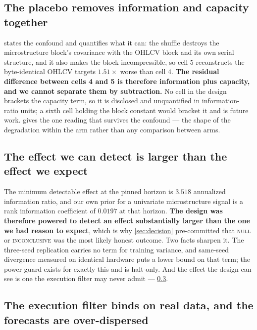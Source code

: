 \subsection{The placebo removes information and capacity together}
\label{sec:lim-placebo}

 states the confound and quantifies what it can: the shuffle destroys the
microstructure block's covariance with the OHLCV block and its own serial structure, and it also makes the
block incompressible, so cell 5 reconstructs the byte-identical OHLCV targets $1.51\times$ worse
than cell 4. \textbf{The residual difference between cells 4 and 5 is therefore information plus
capacity, and we cannot separate them by subtraction.} No cell in the design brackets the capacity
term, so it is disclosed and unquantified in information-ratio units; a sixth cell holding the
block constant would bracket it and is future work.  gives the one reading
that survives the confound --- the shape of the degradation within the arm rather than any
comparison between arms.

\subsection{The effect we can detect is larger than the effect we expect}
\label{sec:lim-power}

The minimum detectable effect at the pinned horizon is $3.518$ annualized information ratio, and
our own prior for a univariate microstructure signal is a rank information coefficient of $0.0197$
at that horizon. \textbf{The design was therefore powered to detect an effect substantially larger
than the one we had reason to expect}, which is why \cref{sec:decision} pre-committed that
\textsc{null} or \textsc{inconclusive} was the most likely honest outcome. Two facts sharpen it. The
three-seed replication carries no term for training variance, and same-seed divergence measured on
identical hardware puts a lower bound on that term; the power guard exists for exactly this and is
halt-only. And the effect the design can see is one the execution filter may never admit ---
\cref{sec:lim-filter}.

\subsection{The execution filter binds on real data, and the forecasts are over-dispersed}
\label{sec:lim-filter}

